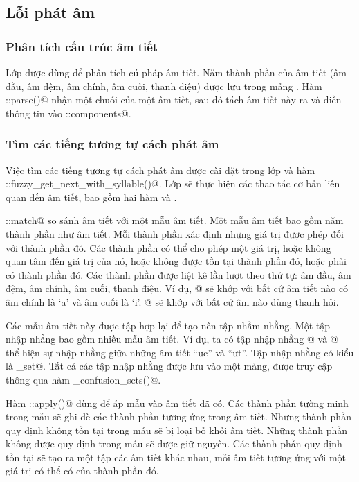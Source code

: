 \documentclass[a4paper,oneside,14pt]{extbook} %
\begin{document}
\subsection{Lỗi phát âm}

\subsubsection{Phân tích cấu trúc âm tiết}

Lớp \verb@Syllable@ được dùng để phân tích cú pháp âm tiết. Năm thành
phần của âm tiết (âm đầu, âm đệm, âm chính, âm cuối, thanh điệu) được
lưu trong mảng \verb@components@. Hàm \verb@Syllable::parse()@ nhận
một chuỗi của một âm tiết, sau đó tách âm tiết này ra và điền thông
tin vào \verb@Syllable::components@.

\subsubsection{Tìm các tiếng tương tự cách phát âm}

Việc tìm các tiếng tương tự cách phát âm được cài đặt trong lớp
\verb@Syllable@ và hàm
\verb@FuzzyWordNode::fuzzy_get_next_with_syllable()@. Lớp
\verb@Syllable@ sẽ thực hiện các thao tác cơ bản liên quan đến âm
tiết, bao gồm hai hàm \verb@match@ và \verb@apply@.

\verb@Syllable::match@ so sánh âm tiết với một mẫu âm tiết. Một mẫu
âm tiết bao gồm năm thành phần như âm tiết. Mỗi thành phần xác định
những giá trị được phép đối với thành phần đó. Các thành phần có thể
cho phép một giá trị, hoặc không quan tâm đến giá trị của nó, hoặc
không được tồn tại thành phần đó, hoặc phải có thành phần đó. Các
thành phần được liệt kê lần lượt theo thứ tự: âm đầu, âm đệm, âm
chính, âm cuối, thanh điệu. Ví dụ, \verb@[?,?,a,i,?]@ sẽ
khớp với bất cứ âm tiết nào có âm chính là `a' và âm cuối là
`i'. \verb@[?,?,?,?,Hook]@ sẽ khớp với bất cứ âm nào dùng
thanh hỏi.

Các mẫu âm tiết này được tập hợp lại để tạo nên tập nhầm nhằng. Một
tập nhập nhằng bao gồm nhiều mẫu âm tiết. Ví dụ, ta có tập nhập nhằng
\verb@[?,?,ư,t,?]@ và \verb@[?,?,ư,c,?]@ thể
hiện sự nhập nhằng giữa những âm tiết ``ưc'' và ``ưt''. Tập nhập nhằng
có kiểu là \verb@confusion_set@. Tất cả các tập nhập nhằng được lưu
vào một mảng, được truy cập thông qua hàm \verb@get_confusion_sets()@.

Hàm \verb@Syllable::apply()@ dùng để áp mẫu vào âm tiết đã có. Các
thành phần tường minh trong mẫu sẽ ghi đè các thành phần tương ứng
trong âm tiết. Nhưng thành phần quy định không tồn tại trong mẫu sẽ bị
loại bỏ khỏi âm tiết. Những thành phần không được quy định trong mẫu
sẽ được giữ nguyên. Các thành phần quy định tồn tại sẽ tạo ra một tập
các âm tiết khác nhau, mỗi âm tiết tương ứng với một giá trị có thể có
của thành phần đó.
\end{document}
